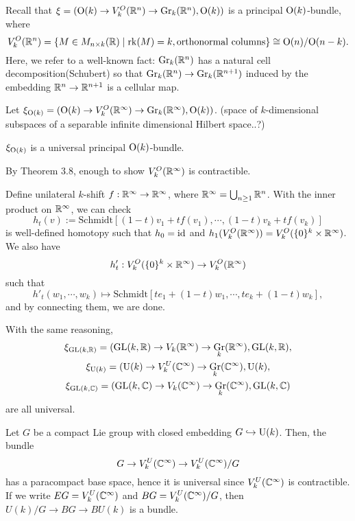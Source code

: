 \documentclass{../../../small}
\DeclareMathOperator{\Gr}{Gr}
\begin{document}
\begin{ex*}
Recall that $\xi=(\mathrm{O}(k)\to V_k^O(\mathbb{R}^n)\to\mathrm{Gr}_k(\mathbb{R}^n),\mathrm{O}(k))$ is a principal $\mathrm{O}(k)$-bundle, where
\[V_k^O(\mathbb{R}^n)=\{M\in M_{n\times k}(\mathbb{R})\mid\operatorname{rk}(M)=k,\text{orthonormal columns}\}\cong\mathrm{O}(n)/\mathrm{O}(n-k).\]
Here, we refer to a well-known fact: $\mathrm{Gr}_k(\mathbb{R}^n)$ has a natural cell decomposition(Schubert) so that $\Gr_k(\R^n)\to\Gr_k(\R^{n+1})$ induced by the embedding $\mathbb{R}^n\to\mathbb{R}^{n+1}$ is a cellular map.

Let $\xi_{\rO(k)}=(\rO(k)\to V_k^O(\R^\infty)\to\Gr_k(\R^\infty),\rO(k))$.
(space of $k$-dimensional subspaces of a separable infinite dimensional Hilbert space..?)
\end{ex*}
\begin{thm*}[3.10]
$\xi_{\mathrm{O}(k)}$ is a universal principal $\mathrm{O}(k)$-bundle.
\end{thm*}
\begin{pf}
By Theorem 3.8, enough to show $V_k^O(\mathbb{R}^\infty)$ is contractible.

Define unilateral $k$-shift $f:\mathbb{R}^\infty\to\mathbb{R}^\infty$, where $\mathbb{R}^\infty=\bigcup_{n\ge1}\mathbb{R}^n$.
With the inner product on $\mathbb{R}^\infty$, we can check
\[h_t(v):=\mathrm{Schmidt}[(1-t)v_1+tf(v_1),\cdots,(1-t)v_k+tf(v_k)]\]
is well-defined homotopy such that $h_0=\operatorname{id}$ and $h_1(V_k^O(\mathbb{R}^\infty))=V_k^O(\{0\}^k\times\mathbb{R}^\infty)$.
We also have
\[h'_t:V_k^O(\{0\}^k\times\mathbb{R}^\infty)\to V_k^O(\mathbb{R}^\infty)\]
such that
\[h'_t(w_1,\cdots,w_k)\mapsto\mathrm{Schmidt}[te_1+(1-t)w_1,\cdots,te_k+(1-t)w_k],\]
and by connecting them, we are done.
\end{pf}
With the same reasoning,
\begin{gather*}
\xi_{\GL(k,\R)}=(\GL(k,\R)\to V_k(\R^\infty)\to\Gr_k(\R^\infty),\GL(k,\R),\\
\xi_{\rU(k)}=(\rU(k)\to V_k^U(\C^\infty)\to\Gr_k(\C^\infty),\rU(k),\\
\xi_{\GL(k,\C)}=(\GL(k,\C)\to V_k(\C^\infty)\to\Gr_k(\C^\infty),\GL(k,\C)
\end{gather*}
are all universal.

\begin{ex*}
Let $G$ be a compact Lie group with closed embedding $G\hookrightarrow\mathrm{U}(k)$.
Then, the bundle
\[G\to V_k^U(\mathbb{C}^\infty)\to V_k^U(\mathbb{C}^\infty)/G\]
has a paracompact base space, hence it is universal since $V_k^U(\mathbb{C}^\infty)$ is contractible.
If we write $EG=V_k^U(\mathbb{C}^\infty)$ and $BG=V_k^U(\mathbb{C}^\infty)/G$, then $U(k)/G\to BG\to BU(k)$ is a bundle.
\end{ex*}
\end{document}
